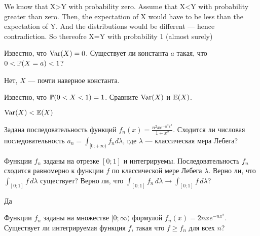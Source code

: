 \begin{solution}
\begin{solution}
\begin{solution}
\begin{solution}
\begin{solution}
\begin{solution}
We know that X>Y with probability zero. Assume that X<Y with probability greater than zero. Then, the expectation of X would have to be less than the expectation of Y. And the distributions would be different --- hence contradiction. So thereofre X=Y with probability 1 (almost surely) 
\end{solution}

\begin{problem}
Известно, что $\Var(X)=0$. Существует ли константа $a$ такая, что $0<\P(X=a)<1$?
\end{problem} 
\begin{solution} 
Нет, $X$ --- почти наверное константа.
\end{solution}

\begin{problem}
Известно, что $\P(0<X<1)=1$. Сравните $\Var(X)$ и $\E(X)$.
\end{problem} 
\begin{solution} 
$\Var(X)<\E(X)$
\end{solution}

\begin{problem}
Задана последовательность функций $f_n(x)=\frac{n^2 x e^{-n^2 x^2}}{1+x^2}$. Сходится ли числовая последовательность $a_n=\int_{[0;+\infty)}f_n d\lambda$, где $\lambda$ --- классическая мера Лебега?
\end{problem} 
\begin{solution} 

\end{solution}

\begin{problem}
Функции $f_n$ заданы на отрезке $[0;1]$ и интегрируемы. Последовательность $f_n$ сходится равномерно к функции $f$ по классической мере Лебега $\lambda$. Верно ли, что $\int_{[0;1]} f\,d\lambda$ существует? Верно ли, что $\int_{[0;1]} f_n\,d\lambda\to \int_{[0;1]} f\,d\lambda$?
\end{problem} 
\begin{solution} 
Да
\end{solution}

\begin{problem}
Функции $f_n$ заданы на множестве $[0;\infty)$ формулой $f_n(x)=2nxe^{-nx^2}$. Существует ли  интегрируемая функция $f$, такая что $f\geq f_n$ для всех $n$?
\end{problem} 
\begin{solution} 
}


\section{Характеристическая функция} 


\end{solution}
\end{solution}
\end{solution}
\end{solution}
\end{solution}
\end{solution}

